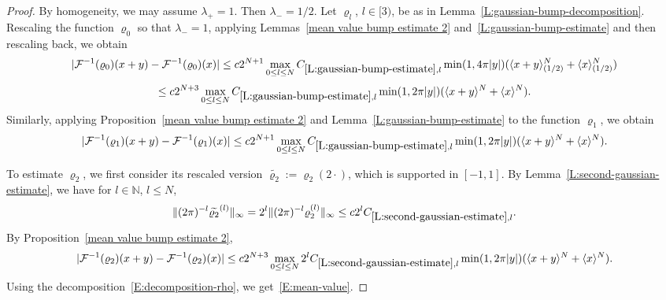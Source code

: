 \documentclass[12pt,reqno]{amsart}
\theoremstyle{plain}
\numberwithin{equation}{section}
\theoremstyle{remark}
\begin{document}
\begin{proof}
By homogeneity, we may assume $\lambda_{+}=1$. Then $\lambda_{-}=1/2$.
Let $\varrho_l$, $l\in [3)$, be as in Lemma~\ref{L:gaussian-bump-decomposition}. Rescaling the function $\varrho_0$ so that $\lambda_{-}=1$, applying Lemmas~\ref{mean value bump estimate 2} and~\ref{L:gaussian-bump-estimate} and then rescaling back, we obtain
\begin{equation*}
     |\mathcal{F}^{-1}(\varrho_0)(x+y)-\mathcal{F}^{-1}(\varrho_0)(x)|\le c2^{N+1}\max_{0\leq l \leq N} C_{\ref{L:gaussian-bump-estimate},l}
     \min(1,4\pi|y|) (\langle x+y\rangle^N_{(1/2)}+
\langle x\rangle^N_{(1/2)})
\end{equation*}
\[
\leq c 2^{N+3} \max_{0\leq l \leq N} C_{\ref{L:gaussian-bump-estimate},l} \min(1,2\pi|y|) (\langle x+y\rangle^N+
\langle x\rangle^N).
\]
Similarly, applying Proposition~\ref{mean value bump estimate 2} and Lemma~\ref{L:gaussian-bump-estimate} to the function $\varrho_1$, we obtain
\begin{equation*}
     |\mathcal{F}^{-1}(\varrho_1)(x+y)-\mathcal{F}^{-1}(\varrho_1)(x)|\le c 2^{N+1}\max_{0\leq l \leq N} C_{\ref{L:gaussian-bump-estimate},l}
     \min(1,2\pi|y|) (\langle x+y\rangle^N+
\langle x\rangle^N).
\end{equation*}

To estimate $\varrho_2$, we first consider its rescaled version $\widetilde{\varrho_2}:=\varrho_2(2\cdot)$, which is supported in $[-1,1]$. By Lemma~\ref{L:second-gaussian-estimate}, we have for $l\in \mathbb N$, $l\leq N$,
\[
\|(2\pi)^{-l}\widetilde{\varrho_2}^{(l)}\|_{\infty}
=2^l\|(2\pi)^{-l}\varrho_2^{(l)}\|_{\infty}
\leq c 2^lC_{\ref{L:second-gaussian-estimate},l}.
\]
By Proposition~\ref{mean value bump estimate 2},
\begin{equation*}
     |\mathcal{F}^{-1}(\varrho_2)(x+y)-\mathcal{F}^{-1}(\varrho_2)(x)|\le c 2^{N+3}\max_{0\leq l \leq N} 2^lC_{\ref{L:second-gaussian-estimate},l}
     \min(1,2\pi|y|) (\langle x+y\rangle^N+
\langle x\rangle^N).
\end{equation*}
Using the decomposition~\eqref{E:decomposition-rho}, we get~\eqref{E:mean-value}.
\end{proof}
\end{document}
